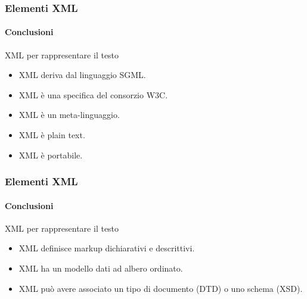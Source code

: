 \begin{frame}
    \frametitle{Elementi XML}
    \framesubtitle{Conclusioni}
    \addtocounter{nframe}{1}

    \begin{block}{XML per rappresentare il testo}
        \begin{itemize}
            \item XML deriva dal linguaggio SGML.
            \item XML è una specifica del consorzio W3C.
            \item XML è un meta-linguaggio.
            \item XML è plain text.
            \item XML è portabile.
        \end{itemize}

    \end{block}

\end{frame}

\begin{frame}
    \frametitle{Elementi XML}
    \framesubtitle{Conclusioni}
    \addtocounter{nframe}{1}

    \begin{block}{XML per rappresentare il testo}
        \begin{itemize}
            \item XML definisce markup dichiarativi e descrittivi.
            \item XML ha un modello dati ad albero ordinato.
            \item XML può avere associato un tipo di documento (DTD) o uno schema (XSD).
        \end{itemize}

    \end{block}

\end{frame}
